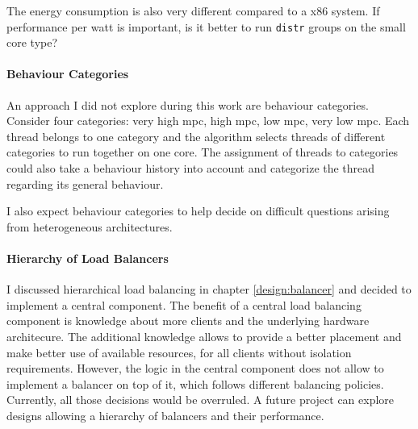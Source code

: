 The energy consumption is also very different compared to a x86 system.
If performance per watt is important, is it better to run \texttt{distr} groups
on the small core type?


\paragraph{Behaviour Categories}
An approach I did not explore during this work are behaviour categories.
Consider four categories: very high \gls{mpc}, high \gls{mpc}, low \gls{mpc},
very low \gls{mpc}.
Each thread belongs to one category and the algorithm selects threads of
different categories to run together on one core.
The assignment of threads to categories could also take a behaviour history
into account and categorize the thread regarding its general behaviour.

I also expect behaviour categories to help decide on difficult questions
arising from heterogeneous architectures.

\paragraph{Hierarchy of Load Balancers}
I discussed hierarchical load balancing in chapter \ref{design:balancer} and
decided to implement a central component.
The benefit of a central load balancing component is knowledge about more
clients and the underlying hardware architecure.
The additional knowledge allows to provide a better placement and make better
use of available resources, for all clients without isolation requirements.
However, the logic in the central component does not allow to implement a
balancer on top of it, which follows different balancing policies.
Currently, all those decisions would be overruled.
A future project can explore designs allowing a hierarchy of balancers and
their performance.

\begin{comment}
\paragraph{Workload-aware balancing}
The modular approach allows quick replacement and testing of different
algorithms in the various components.
If very specific workloads run on the system, tuned balancing algorithms for
this specific workload can be used to increase the performance of the system.
\end{comment}


\cleardoublepage


